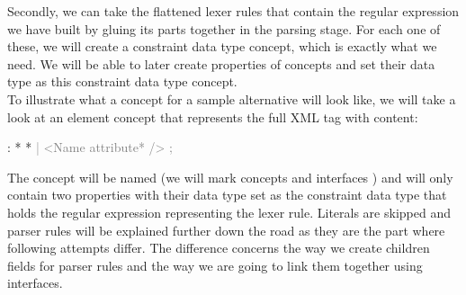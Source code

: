 Secondly, we can take the flattened lexer rules that contain the regular expression we have built by gluing its parts together in the parsing stage. For each one of these, we will create a constraint data type concept, which is exactly what we need. We will be able to later create properties of concepts and set their data type as this constraint data type concept.
\\

To illustrate what a concept for a sample alternative will look like, we will take a look at an element concept that represents the full XML tag with content:

\begin{antlr}
	      :   \literal{<}  * \literal{>} * \literal{</}  \literal{>}
             \textcolor{gray}{|   \ap<\ap Name attribute* \ap/>\ap}
             \textcolor{gray}{;}
\end{antlr}

The concept will be named  (we will mark concepts  and interfaces ) and will only contain two properties with their data type set as the constraint data type that holds the regular expression representing the  lexer rule. Literals are skipped and parser rules will be explained further down the road as they are the part where following attempts differ. The difference concerns the way we create children fields for parser rules and the way we are going to link them together using interfaces.



\pagebreak

